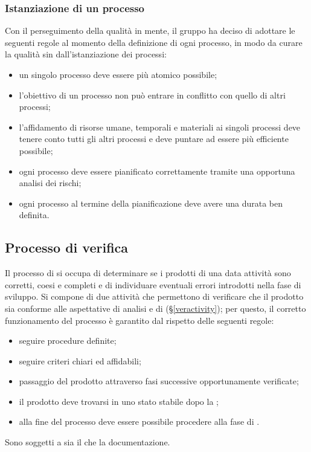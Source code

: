 {{\subsubsection{Istanziazione di un processo}
Con il perseguimento della qualità in mente, il gruppo \textit{\Gruppo{}} ha deciso di adottare le seguenti regole al momento della definizione di ogni processo, in modo da curare la qualità sin dall'istanziazione dei processi:
\begin{itemize}
	\item un singolo processo deve essere più atomico possibile;
	\item l'obiettivo di un processo non può entrare in conflitto con quello di altri processi;
	\item l'affidamento di risorse umane, temporali e materiali ai singoli processi deve tenere conto tutti gli altri processi e deve puntare ad essere più efficiente possibile;
	\item ogni processo deve essere pianificato correttamente tramite una opportuna analisi dei rischi;
	\item ogni processo al termine della pianificazione deve avere una durata ben definita.
\end{itemize}
\subsection{Processo di verifica}
Il processo di  si occupa di determinare se i prodotti di una data attività sono corretti, coesi e completi e di individuare eventuali errori introdotti nella fase di sviluppo. Si compone di due attività che permettono di verificare che il prodotto sia conforme alle aspettative di analisi e di  (\S{}\ref{veractivity}); per questo, il corretto funzionamento del processo è garantito dal rispetto delle seguenti regole: 
\begin{itemize}
	\item seguire procedure definite;
	\item seguire criteri chiari ed affidabili;
	\item passaggio del prodotto attraverso fasi successive opportunamente verificate;
	\item il prodotto deve trovarsi in uno stato stabile dopo la ;
	\item alla fine del processo deve essere possibile procedere alla fase di .
\end{itemize}
Sono soggetti a  sia il  che la documentazione. 

}}
